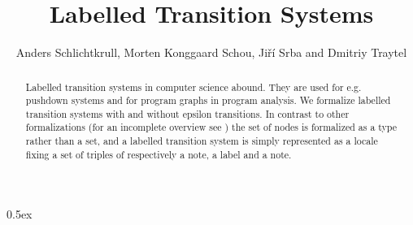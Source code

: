 \documentclass[10pt,a4paper]{article}
\begin{document}
\title{Labelled Transition Systems}
\author{Anders Schlichtkrull, Morten Konggaard Schou, Ji\v{r}\'i Srba and Dmitriy Traytel}
\date{}

\maketitle

\begin{abstract}
\noindent
Labelled transition systems in computer science abound. They are used for e.g. pushdown systems and for program graphs in program analysis.
We formalize labelled transition systems with and without epsilon transitions.
In contrast to other formalizations (for an incomplete overview see \cite{graphs}) the set of nodes is formalized as a type rather than a set,
and a labelled transition system is simply represented as a locale fixing a set of triples of respectively a note, a label and a note.


\end{abstract}

\tableofcontents

\newpage

\parindent 0pt
\parskip 0.5ex

\newpage





\end{document}
